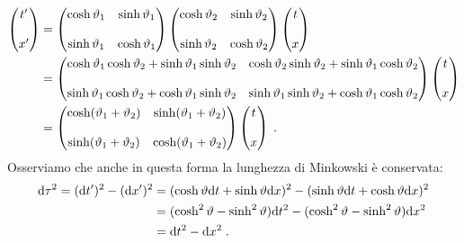 \begin{align}
\begin{pmatrix}
t' \\
\\
x'
\end{pmatrix} &=\begin{pmatrix}
\cosh\vartheta_1 & \sinh\vartheta_1 \\
\\
\sinh\vartheta_1 & \cosh\vartheta_1
\end{pmatrix}\begin{pmatrix}
\cosh\vartheta_2 & \sinh\vartheta_2 \\
\\
\sinh\vartheta_2 & \cosh\vartheta_2
\end{pmatrix}\begin{pmatrix}
t \\
\\
x
\end{pmatrix} \notag \\
&=\begin{pmatrix}
\cosh\vartheta_1\cosh\vartheta_2+\sinh\vartheta_1\sinh\vartheta_2 & \cosh\vartheta_2\sinh\vartheta_2+\sinh\vartheta_1\cosh\vartheta_2 \\
\\
\sinh\vartheta_1\cosh\vartheta_2+\cosh\vartheta_1\sinh\vartheta_2 & \sinh\vartheta_1\sinh\vartheta_2+\cosh\vartheta_1\cosh\vartheta_2
\end{pmatrix}\begin{pmatrix}
t \\
\\
x
\end{pmatrix}\notag \\
&=\begin{pmatrix}
\cosh(\vartheta_1+\vartheta_2) & \sinh(\vartheta_1+\vartheta_2) \\
\\
\sinh(\vartheta_1+\vartheta_2) & \cosh(\vartheta_1+\vartheta_2)
\end{pmatrix}\begin{pmatrix}
t \\
\\
x
\end{pmatrix}\;.
\end{align}
Osserviamo che anche in questa forma la lunghezza di Minkowski è conservata:
\begin{align}
\mathrm{d}{\tau}^2= (\mathrm{d}{t'})^2-(\mathrm{d}{x'})^2 &= (\cosh\vartheta\mathrm{d}{t}+\sinh\vartheta\mathrm{d}{x})^2-(\sinh\vartheta\mathrm{d}{t}+\cosh\vartheta\mathrm{d}{x})^2 \notag \\
&=(\cosh^2\vartheta-\sinh^2\vartheta)\mathrm{d}{t}^2-(\cosh^2\vartheta-\sinh^2\vartheta)\mathrm{d}{x}^2 \notag \\
&= \mathrm{d}{t}^2-\mathrm{d}{x}^2\;.
\end{align}
